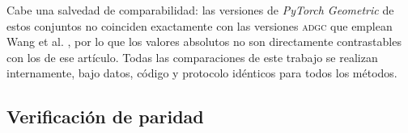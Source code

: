 \documentclass[twoside,twocolumn,10pt]{article}
\begin{document}
\begin{table}[htbp]
\centering
\caption{Conjuntos de datos empleados: número de nodos $n$, dimensión de características $F$ y número de comunidades de referencia $k$.}
\label{tab:conjuntos-datos}
\renewcommand{\arraystretch}{1.2}
\end{table}

Cabe una salvedad de comparabilidad: las versiones de \textit{PyTorch Geometric} de estos conjuntos no coinciden exactamente con las versiones \textsc{adgc} que emplean Wang et al. \cite{Wang2025}, por lo que los valores absolutos no son directamente contrastables con los de ese artículo. Todas las comparaciones de este trabajo se realizan internamente, bajo datos, código y protocolo idénticos para todos los métodos.

\subsection{Verificación de paridad}
\label{subsec:implementacion-paridad}
\end{document}
